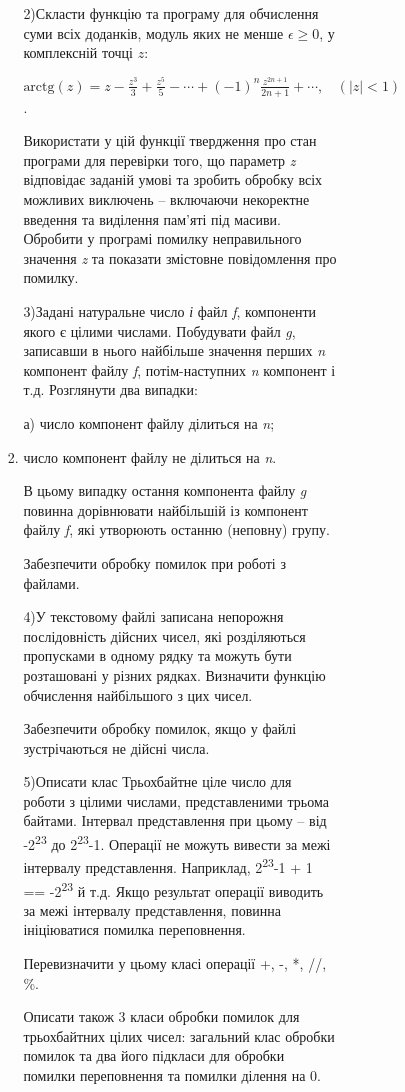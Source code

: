 \documentclass[]{article}
\makeatletter
\newcommand{\xslalph}[1]{\expandafter\@xslalph\csname c@#1\endcsname}
\newcommand{\@xslalph}[1]{%
    \ifcase#1\or а\or б\or в\or г\or д\or e\or є\or ж\or з\or i%
    \or й\or к\or л\or м\or н\or о\or п\or р\or с\or т%
    \or у\or ф\or х\or ц\or ч\or ш\or ю\or я\or аа\or бб\or вв%
    \else\@ctrerr\fi%
}
\makeatother
\begin{document}
\begin{enumerate}
\begin{enumerate}[label=\xslalph*)]
\begin{enumerate}
\begin{enumerate}[label=\xslalph*)]
\begin{enumerate}
\begin{enumerate}[label=\xslalph*)]
\begin{enumerate}
\begin{enumerate}[label=\xslalph*)]
2)Скласти функцію та програму для обчислення суми всіх доданків, модуль
яких не менше $\epsilon \ge 0$, у комплексній точці $z$:

\(\text{arctg}\left( z \right) = z - \frac{z^{3}}{3} + \frac{z^{5}}{5} - \cdots + {( - 1)}^{n}\frac{z^{2n + 1}}{2n + 1} + \cdots,\ \ \ \ (\left| z \right| < 1)\).

Використати у цій функції твердження про стан програми для перевірки
того, що параметр \emph{z} відповідає заданій умові та зробить обробку
всіх можливих виключень -- включаючи некоректне введення та виділення
пам'яті під масиви. Обробити у програмі помилку неправильного значення
\emph{z} та показати змістовне повідомлення про помилку.

3)Задані натуральне число \emph{і} файл \emph{f}, компоненти якого є
цілими числами. Побудувати файл \emph{g}, записавши в нього найбільше
значення перших \emph{n} компонент файлу \emph{f}, потім-наступних
\emph{n} компонент і т.д. Розглянути два випадки:

а) число компонент файлу ділиться на \emph{n};
\item число компонент файлу не ділиться на \emph{n}.

В цьому випадку остання компонента файлу \emph{g} повинна дорівнювати
найбільшій із компонент файлу \emph{f}, які утворюють останню (неповну)
групу.

Забезпечити обробку помилок при роботі з файлами.

4)У текстовому файлі записана непорожня послідовність дійсних чисел, які
розділяються пропусками в одному рядку та можуть бути розташовані у
різних рядках. Визначити функцію обчислення найбільшого з цих чисел.

Забезпечити обробку помилок, якщо у файлі зустрічаються не дійсні числа.

5)Описати клас Трьохбайтне ціле число для роботи з цілими числами,
представленими трьома байтами. Інтервал представлення при цьому -- від
-2\textsuperscript{23} до 2\textsuperscript{23}-1. Операції не можуть
вивести за межі інтервалу представлення. Наприклад,
2\textsuperscript{23}-1 + 1 == -2\textsuperscript{23} й т.д. Якщо
результат операції виводить за межі інтервалу представлення, повинна
ініціюватися помилка переповнення.

Перевизначити у цьому класі операції +, -, *, //, \%.

Описати також 3 класи обробки помилок для трьохбайтних цілих чисел:
загальний клас обробки помилок та два його підкласи для обробки помилки
переповнення та помилки ділення на 0.


\end{enumerate}
\end{enumerate}
\end{enumerate}
\end{enumerate}
\end{enumerate}
\end{enumerate}
\end{enumerate}
\end{enumerate}
\end{document}
